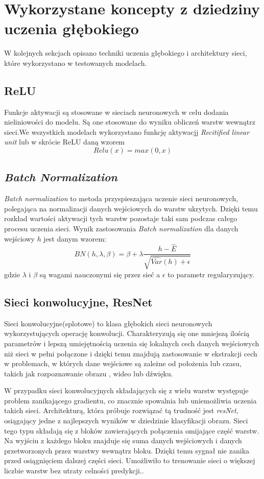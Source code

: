 \documentclass[a4paper,11pt,twoside]{report}
\theoremstyle{definition}
\begin{document}
\section{Wykorzystane koncepty z dziedziny uczenia głębokiego}

W kolejnych sekcjach opisano techniki uczenia głębokiego i architektury sieci, które wykorzystano w testowanych modelach.

\subsection{ReLU}

Funkcje aktywacji są stosowane w sieciach neuronowych w celu dodania nieliniowości do modelu. Są one stosowane do wyniku obliczeń warstw wewnątrz sieci.We wszystkich modelach wykorzystano funkcję aktywacjj \textit{Recitified linear unit} lub w skrócie ReLU daną wzorem
\[Relu(x) = max(0,x)\]

\subsection{\textit{Batch Normalization}}

\textit{Batch normalization} to metoda przyspieszająca uczenie sieci neuronowych, polegająca na normalizacji danych wejściowych do warstw ukrytych. Dzięki temu rozkład wartości aktywacji tych warstw pozostaje taki sam podczas całego procesu uczenia sieci. Wynik zastosowania \textit{Batch normalization } dla danych wejściowy $h$ jest danym wzorem:
\[BN(h, \lambda, \beta)=\beta+\lambda\frac{h-\hat{E}}{\sqrt{\hat{Var}(h)+\epsilon}}\]
gdzie $\lambda$ i $\beta$ są wagami nauczonymi się przez sieć a $\epsilon$ to parametr regularyzujący.

\subsection{Sieci konwolucyjne, ResNet}

Sieci konwolucyjne(splotowe) to klasa głębokich sieci neuronowych wykorzystujących operację konwolucji. Charakteryzują się one mniejszą ilością parametrów i lepszą umiejętnością uczenia się lokalnych cech danych wejściowych niż sieci w pełni połączone\cite{cnn} i dzięki temu znajdują zastosowanie w ekstrakcji cech w problemach, w których dane wejściowe są zależne od położenia lub czasu, takich jak rozpoznawanie obrazu \cite{vgg}, wideo\cite{cnnVideo} lub dźwięku\cite{cnnAudio}. 

W przypadku sieci konwolucyjnych składających się z wielu warstw występuje problem zanikającego gradientu, co znacznie spowalnia lub uniemożliwia uczenia takich sieci\cite{difficulty}.
Architekturą, która próbuje rozwiązać tą trudność jest \textit{resNet}, osiągający jedne z najlepszych wyników w dziedzinie klasyfikacji obrazu. Sieci tego typu składają się z bloków zawierających połączenia omijające część warstw. Na wyjściu z każdego bloku znajduje się suma danych wejściowych i danych przetworzonych przez warstwy wewnątrz bloku. Dzięki temu sygnał nie zanika przed osiągnięciem dalszej części sieci. Umożliwiło to trenowanie sieci o większej liczbie warstw bez utraty celności predykcji.\cite{resnet}.
\end{document}
